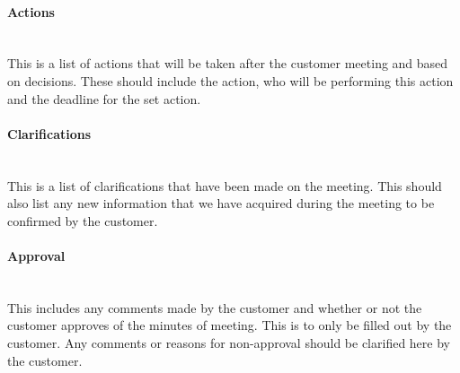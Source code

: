 \documentclass[../document]{subfiles}
\begin{document}
\paragraph{Actions} \ \\
This is a list of actions that will be taken after the customer meeting and based on decisions. These should include the action, who will be performing this action and the deadline for the set action.

\paragraph{Clarifications} \ \\
This is a list of clarifications that have been made on the meeting. This should also list any new information that we have acquired during the meeting to be confirmed by the customer.

\paragraph{Approval} \ \\
This includes any comments made by the customer and whether or not the customer approves of the minutes of meeting. This is to only be filled out by the customer. Any comments or reasons for non-approval should be clarified here by the customer.
\end{document}
